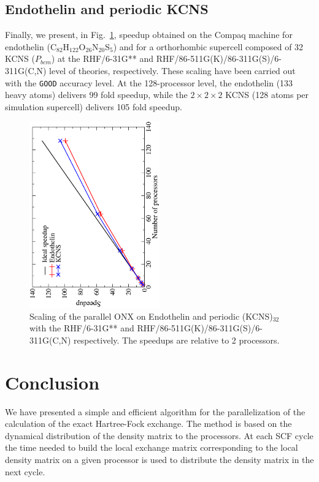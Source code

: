\documentclass[prl,twocolumn,showpacs,twocolumngrid,superbib]{revtex4}
\begin{document}
\subsection{Endothelin and periodic KCNS}
Finally, we present, in Fig.~\ref{fig:Endothelin_KCNS}, 
speedup obtained on the Compaq machine for 
endothelin (C$_{82}$H$_{122}$O$_{26}$N$_{20}$S$_5$) and
for a orthorhombic supercell composed of 32 KCNS ($P_{bcm}$)
at the RHF/6-31G** and RHF/86-511G(K)/86-311G(S)/6-311G(C,N) 
level of theories, respectively.
These scaling have been carried out with the {\tt GOOD} accuracy level.
At the 128-processor level, the endothelin (133 heavy atoms) delivers 99 fold
speedup, while the $2\times 2\times 2$ KCNS (128 atoms per simulation supercell)
delivers 105 fold speedup. 

\begin{figure}[p]
  \caption{\protect
    Scaling of the parallel ONX on Endothelin and periodic (KCNS)$_{32}$ with 
    the RHF/6-31G** and RHF/86-511G(K)/86-311G(S)/6-311G(C,N) respectively.
    The speedups are relative to 2 processors.
  }\label{fig:Endothelin_KCNS}
  \includegraphics[angle=-90,width=0.5\textwidth]{Endothelin_KCNS}
\end{figure}

\section{Conclusion}\label{Sec:Conc}

 We have presented a simple and efficient algorithm for 
 the parallelization of the calculation of the exact Hartree-Fock
 exchange. The method is based on the dynamical distribution 
 of the density matrix to the processors. At each SCF cycle the
 time needed to build the local exchange matrix corresponding
 to the local density matrix on a given processor is used to
 distribute the density matrix in the next cycle. 
\end{document}
